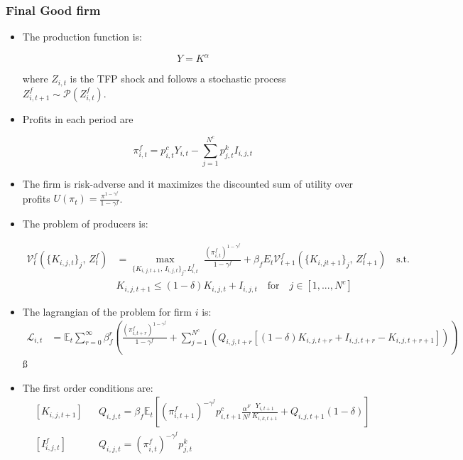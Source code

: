 \documentclass[11pt]{article}
\newcommand{\E}{\mathbb{E}}
\numberwithin{equation}{section}
\begin{document}
\begin{itemize}
	\subsubsection{Final Good firm}
	
	\begin{itemize}
		
		\item The production function is:
		
		$$Y=K^{\alpha}$$
		
		where $Z_{i,t}$ is the TFP shock and follows a stochastic process $Z^f_{i,t+1} \sim \mathcal{P}(Z^f_{i,t})$. 
		
		\item Profits in each period are
		
		$$\pi^f_{i,t}=p^c_{i,t} Y_{i,t}-\sum_{j=1}^{N^c} p^k_{j,t} I_{i,j,t}$$
		
		\item The firm is risk-adverse and it maximizes the discounted sum of utility over profits $U(\pi_t) = \frac{\pi^{1-\gamma^f}}{1-\gamma^f}$.
		
		\item The problem of producers is:
		
		\begin{align*}
		\mathcal{V}_{t}^{f}\left(\{K_{i,j,t}\}_j,\,Z_t^f\right)&=\max_{\{K_{i,j,t+1},\, I_{i,j,t}\}_j,  L^f_{i,t}}\,\,
		\frac{\left(\pi_{i,t}^f\right)^{1-\gamma^f}}{1-\gamma^f}+\beta_f E_{t}\mathcal{V}^f_{t+1}(\{K_{i,jt+1}\}_j,\,Z_{t+1}^f)\quad\text{{s.t.}}\\
		&K_{i,j,t+1} \leq(1-\delta)K_{i,j,t}+I_{i,j,t} \quad \text{for} \quad j \in [1,...,N^c]
		\end{align*}
		
		\item The lagrangian of the problem for firm $i$ is:
		\begin{align*}
		\mathcal{L}_{i,t} &= \E_t \sum_{r=0}^{\infty}\beta^r_f \left(\frac{\left(\pi_{i,t+r}^f\right)^{1-\gamma^f}}{1-\gamma^f} +
		\sum_{j=1}^{N^c} \left(Q_{i,j,t+r} [(1-\delta)K_{i,j,t+r}+I_{i,j,t+r} -K_{i,j,t+r+1}]\right) \right)
		\end{align*}ß
		
		\item The first order conditions are:
		\begin{align}
		& \left[K_{i,j,t+1}\right]
		&&
		Q_{i,j,t} =\beta_f \E_t \left[\left(\pi_{i,t+1}^f\right)^{-\gamma^f} p^c_{i,t+1} \frac{\alpha^F}{N^f} \frac{Y_{i,t+1}}{K_{i,k,t+1}} +Q_{i,j,t+1} (1-\delta) \right]
		\\
		& \left[ I^f_{i,j,t} \right]
		&&
		Q_{i,j,t} = \left(\pi_{i,t}^f\right)^{-\gamma^f} p^k_{j,t}
		\end{align}
		

\end{itemize}
\end{itemize}
\end{document}
